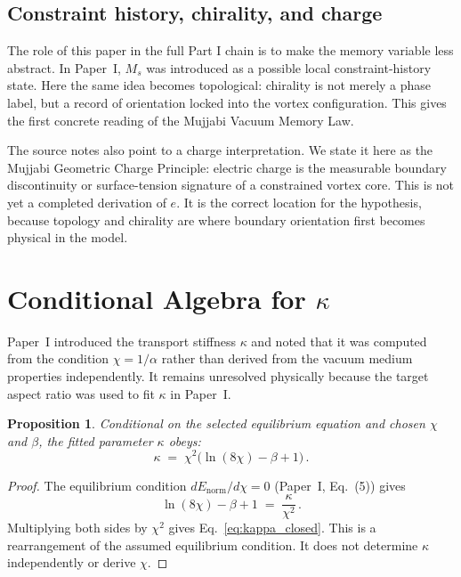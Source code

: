 \documentclass[11pt]{article}
\newtheorem{proposition}{Proposition}
\begin{document}
\subsection{Constraint history, chirality, and charge}

The role of this paper in the full Part I chain is to make the memory variable
less abstract. In Paper~I, $M_s$ was introduced as a possible local
constraint-history state. Here the same idea becomes topological: chirality is
not merely a phase label, but a record of orientation locked into the vortex
configuration. This gives the first concrete reading of the Mujjabi Vacuum
Memory Law.

The source notes also point to a charge interpretation. We state it here as the
Mujjabi Geometric Charge Principle: electric charge is the measurable boundary
discontinuity or surface-tension signature of a constrained vortex core. This is
not yet a completed derivation of $e$. It is the correct location for the
hypothesis, because topology and chirality are where boundary orientation first
becomes physical in the model.


\section{Conditional Algebra for $\kappa$}
\label{sec:kappa}

Paper~I introduced the transport stiffness $\kappa$ and noted that it was
computed from the condition $\chi = 1/\alpha$ rather than derived from the
vacuum medium properties independently.
It remains unresolved physically because the target aspect ratio was used to
fit $\kappa$ in Paper~I.

\begin{proposition}
  Conditional on the selected equilibrium equation and chosen $\chi$ and
  $\beta$, the fitted parameter $\kappa$ obeys:
  \begin{equation}
    \kappa \;=\; \chi^2\bigl(\ln(8\chi) - \beta + 1\bigr)\,.
    \label{eq:kappa_closed}
  \end{equation}
\end{proposition}

\begin{proof}
  The equilibrium condition $dE_\text{norm}/d\chi = 0$ (Paper~I, Eq.~(5)) gives
  \begin{equation}
    \ln(8\chi) - \beta + 1 \;=\; \frac{\kappa}{\chi^2}\,.
  \end{equation}
  Multiplying both sides by $\chi^2$ gives Eq.~\eqref{eq:kappa_closed}.
  This is a rearrangement of the assumed equilibrium condition. It does not
  determine $\kappa$ independently or derive $\chi$.
\end{proof}
\end{document}
